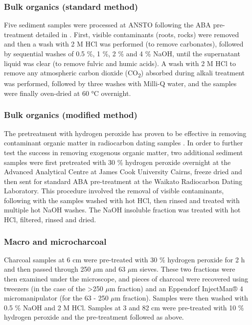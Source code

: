 \documentclass[
  12pt,
]{book}
\begin{document}
\hypertarget{bulk-organics-standard-method}{%
\subsubsection{Bulk organics (standard method)}\label{bulk-organics-standard-method}}

Five sediment samples were processed at ANSTO following the ABA pre-treatment detailed in \citet{hatteClassicalAcidAlkaliAcidTreatment2001}. First, visible contaminants (roots, rocks) were removed and then a wash with 2 M HCl was performed (to remove carbonates), followed by sequential washes of 0.5 \%, 1 \%, 2 \% and 4 \% NaOH, until the supernatant liquid was clear (to remove fulvic and humic acids). A wash with 2 M HCl to remove any atmospheric carbon dioxide (CO\textsubscript{2}) absorbed during alkali treatment was performed, followed by three washes with Milli-Q water, and the samples were finally oven-dried at 60 °C overnight.

\hypertarget{bulk-organics-modified-method}{%
\subsubsection{Bulk organics (modified method)}\label{bulk-organics-modified-method}}

The pretreatment with hydrogen peroxide has proven to be effective in removing contaminant organic matter in radiocarbon dating samples \citep{chiuExtendingRadiocarbonCalibration2005}. In order to further test the success in removing exogenous organic matter, two additional sediment samples were first pretreated with 30 \% hydrogen peroxide overnight at the Advanced Analytical Centre at James Cook University Cairns, freeze dried and then sent for standard ABA pre-treatment at the Waikato Radiocarbon Dating Laboratory. This procedure involved the removal of visible contaminants, following with the samples washed with hot HCl, then rinsed and treated with multiple hot NaOH washes. The NaOH insoluble fraction was treated with hot HCl, filtered, rinsed and dried.

\hypertarget{macro-and-microcharcoal}{%
\subsubsection{Macro and microcharcoal}\label{macro-and-microcharcoal}}

Charcoal samples at 6 cm were pre-treated with 30 \% hydrogen peroxide for 2 h and then passed through 250 \(\mu\)m and 63 \(\mu\)m sieves. These two fractions were then examined under the microscope, and pieces of charcoal were recovered using tweezers (in the case of the \textgreater250 \(\mu\)m fraction) and an Eppendorf InjectMan® 4 micromanipulator (for the 63 - 250 \(\mu\)m fraction). Samples were then washed with 0.5 \% NaOH and 2 M HCl. Samples at 3 and 82 cm were pre-treated with 10 \% hydrogen peroxide and the pre-treatment followed as above.
\end{document}
